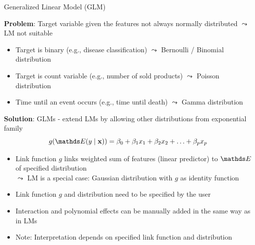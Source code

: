 \documentclass[11pt,compress,t,notes=noshow, aspectratio=169, xcolor=table]{beamer}
\begin{document}
\begin{frame}{Generalized Linear Model (GLM)}

\textbf{Problem}: Target variable given the features not always normally distributed $\leadsto$ LM not suitable
\begin{itemize}
    \item Target is binary (e.g., disease classification) $\leadsto$ Bernoulli / Binomial distribution
    \item Target is count variable (e.g., number of sold products) $\leadsto$ Poisson distribution
    \item Time until an event occurs (e.g., time until death) $\leadsto$ Gamma distribution
\end{itemize}
\medskip
\pause
\textbf{Solution}: GLMs - extend LMs by allowing other distributions from exponential family
$$g(\E (y \mid \xv)) = \beta_0 + \beta_1 x_1 + \beta_2 x_2 + \ldots + \beta_p x_p$$
\vspace*{-0.4cm}
    \begin{itemize}[<+->]
        \item Link function $g$ links weighted sum of features (linear predictor) to $\E$ of specified distribution\\
        $\leadsto$ LM is a special case: Gaussian distribution with $g$ as identity function 
        \item Link function $g$ and distribution need to be specified by the user
        \item Interaction and polynomial effects can be manually added in the same way as in LMs
        \item Note: Interpretation depends on specified link function and distribution
    \end{itemize}
\end{frame}
 	
\end{document}
